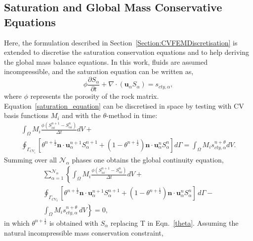 \documentclass[preprint,authoryear,12pt]{elsarticle}
\begin{document}
\subsection{Saturation and Global Mass Conservative Equations}\label{Section:Saturation_Global}
Here, the formulation described in Section~\ref{Section:CVFEMDiscretisation} is extended to discretise the saturation conservation equations and to help deriving the global mass balance equations. In this work, fluids are assumed incompressible, and the saturation equation can be written as,
\begin{equation}
  \phi\displaystyle\frac{\partial S_{\alpha} }{\partial t} +   \nabla \cdot \left( {\mathbf u}_{\alpha}  S_{\alpha}\right) =  s_{cty,\alpha},
  \label{saturation_equation}
\end{equation}
where $\phi$ represents the porosity of the rock matrix. Equation~\ref{saturation_equation} can be discretised in space by testing with CV basis functions $M_{i}$ and with the $\theta$-method in time:
\begin{eqnarray}
  \int_{\Omega} M_{i} \displaystyle\frac{\phi \left({S_{\alpha i}^{n+1}}-{S_{\alpha i}^{n}}\right)}{\Delta t} dV + \nonumber \\ 
  \oint_{\Gamma_{CV_{i}}} \left[\theta^{n+\frac{1}{2}} {\mathbf n} \cdot {\mathbf u}_{\alpha}^{n+1} S_{\alpha}^{n+1} +  \left(1-\theta^{n+\frac{1}{2}}\right) {\mathbf n} \cdot {\mathbf u}_{\alpha}^{n} S_{\alpha}^{n} \right]d\Gamma =  \int_{\Omega} M_{i} {s_{cty,\alpha}^{n+\theta}} dV.
  \label{detail-sat-eqn-k}
\end{eqnarray}
Summing over all $\mathcal{N}_\alpha$ phases one obtains the global continuity equation,
\begin{eqnarray}
  \sum\limits_{\alpha=1}^{\mathcal{N}_{\alpha}} \left\lbrace \int_{\Omega} M_{i} \displaystyle\frac{\phi\left({S_{\alpha i}^{n+1}}-{S_{\alpha i}^{n}}\right) } {\Delta t} dV + \right. \nonumber \\ 
  \left. \displaystyle\oint_{{\Gamma_{CV}}_{i}} \left[\theta^{n+\frac{1}{2}} {\mathbf n} \cdot {\mathbf u}_{\alpha}^{n+1} S_{\alpha}^{n+1} +  \left(1-\theta^{n+\frac{1}{2}}\right) {\mathbf n} \cdot {\mathbf u}_{\alpha}^{n} S_{\alpha}^{n} \right] \,d\Gamma - \right. \nonumber \\
  \left. \displaystyle\int_{\Omega} M_{i} s_{cty,\alpha}^{n+\theta}\, dV \right\rbrace = 0,
           \label{detail-sat-eqn-k-sum}
\end{eqnarray}
in which $\theta^{n+\frac{1}{2}}$ is obtained with $S_\alpha$ replacing T in Eqn.~\ref{theta}. Assuming the natural incompressible mass conservation constraint,
\end{document}
